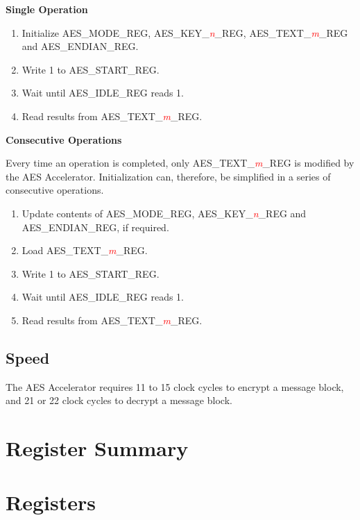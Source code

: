 \documentclass[main\_\_EN.tex]{subfiles}
\begin{document}
\textbf{Single Operation}

\begin{enumerate}
    \item Initialize AES\_MODE\_REG, AES\_KEY\_\textcolor{red}{\it{n}}\_REG, AES\_TEXT\_\textcolor{red}{\it{m}}\_REG and AES\_ENDIAN\_REG.
    \item Write 1 to AES\_START\_REG.
    \item Wait until AES\_IDLE\_REG reads 1.
    \item Read results from AES\_TEXT\_\textcolor{red}{\it{m}}\_REG.
\end{enumerate}

\textbf{Consecutive Operations}

Every time an operation is completed, only AES\_TEXT\_\textcolor{red}{\it{m}}\_REG is modified by the AES Accelerator. Initialization can, therefore, be simplified in a series of consecutive operations.

\begin{enumerate}
    \item Update contents of AES\_MODE\_REG, AES\_KEY\_\textcolor{red}{\it{n}}\_REG and AES\_ENDIAN\_REG, if required.
    \item Load AES\_TEXT\_\textcolor{red}{\it{m}}\_REG.
    \item Write 1 to AES\_START\_REG.
    \item Wait until AES\_IDLE\_REG reads 1.
    \item Read results from AES\_TEXT\_\textcolor{red}{\it{m}}\_REG.
\end{enumerate}

\subsection{Speed}

The AES Accelerator requires 11 to 15 clock cycles to encrypt a message block, and 21 or 22 clock cycles to decrypt a message block.

\hypertarget{aes-reg-summ}{}
\section{Register Summary}\label{sec:aes-reg-summ}



\section{Registers}

\end{document}
